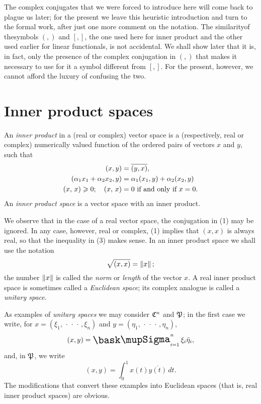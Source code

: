 The complex conjugates that we were forced to introduce here will come back to
plague us later; for the present we leave this heuristic introduction and turn
to the formal work, after just one more comment on the notation. The
similarityof thesymbols \((,)\) and \([, ]\), the one used here for inner product
and the other used earlier for linear functionals, is not accidental. We shall
show later that it is, in fact, only the presence of the complex conjugation in
\((,)\) that makes it necessary to use for it a symbol different from \([, ]\).
For the present, however, we cannot afford the luxury of confusing the two.

\section{Inner product spaces}

\begin{definition}
    An \emph{inner product} in a (real or complex) vector space is a
    (respectively, real or complex) numerically valued function of the ordered
    pairs of vectors \(x\) and \(y\), such that
    \begin{align}
        (x, y) &= \overline{(y, x)}, \\
        (\alpha_1 x_1 + \alpha_2 x_2, y) &= \alpha_1(x_1, y) +
        \alpha_2(x_2, y)\\
        \left(x,\,x\right) \geqslant 0; \quad \left(x,\,x\right) &= 0 \text{ if and only if } x = 0.
    \end{align}
    An \emph{inner product space} is a vector space with an inner product.
\end{definition}

We observe that in the case of a real vector space, the conjugation in (1) may
be ignored. In any case, however, real or complex, (1) implies that \((x, x)\) is
always real, so that the inequality in (3) makes sense. In an inner product
space we shall use the notation
\begin{equation*}
    \sqrt{(x, x)} = \left\lVert x\right\rVert;
\end{equation*}
the number \(\left\lVert x\right\rVert\) is called the \emph{norm} or \emph{length} of the vector
\(x\). A real inner product space is sometimes called a \emph{Euclidean space};
its complex analogue is called a \emph{unitary space}.

As examples of \emph{unitary spaces} we may consider \(\mathfrak{C}^n\) and
\(\mathfrak{P}\); in the first case we write, for \(x = (\xi_1, \, \cdot\, \cdot\, \cdot\,, \xi_n)\) and
\(y = (\eta_1, \, \cdot\, \cdot\, \cdot\,, \eta_n)\),
\begin{equation*}
    (x, y) = \sumx_{i=1}^n \xi_i\bar{\eta}_i,
\end{equation*}
and, in \(\mathfrak{P}\), we write
\begin{equation*}
    (x, y) = \int_{0}^1 x(t)\overline{y(t)}\, dt.
\end{equation*}
The modifications that convert these examples into Euclidean spaces (that is,
real inner product spaces) are obvious.

